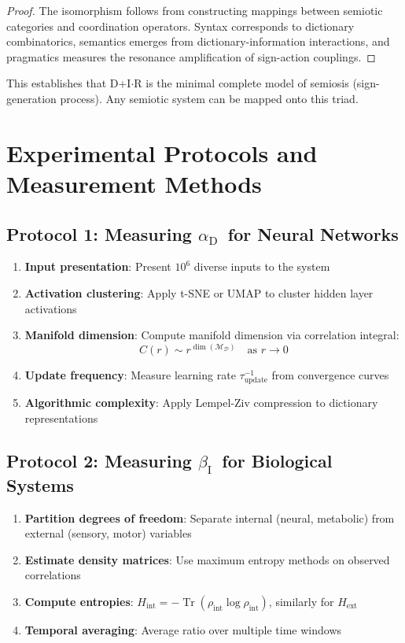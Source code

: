 \documentclass[12pt,a4paper]{article}
\DeclareMathOperator{\Tr}{Tr}
\DeclareMathOperator{\dimension}{dim}
\DeclareRobustCommand{\alD}{\texorpdfstring{\ensuremath{\alpha_{\mathrm{D}}}}{alpha_D}}
\DeclareRobustCommand{\beI}{\texorpdfstring{\ensuremath{\beta_{\mathrm{I}}}}{beta_I}}
\newcommand{\Dict}{\mathcal{D}}
\newcommand{\Mdict}{\mathcal{M}_{\Dict}}
\begin{document}
	\begin{proof}
		The isomorphism follows from constructing mappings between semiotic categories and coordination operators. Syntax corresponds to dictionary combinatorics, semantics emerges from dictionary-information interactions, and pragmatics measures the resonance amplification of sign-action couplings.
	\end{proof}
	
	This establishes that D+I\(\cdot\)R is the minimal complete model of semiosis (sign-generation process). Any semiotic system can be mapped onto this triad.
	
	\section{Experimental Protocols and Measurement Methods}
	
	\subsection{Protocol 1: Measuring \alD\ for Neural Networks}
	\label{subsec:protocol-alpha}
	
	\begin{enumerate}
		\item \textbf{Input presentation}: Present \(10^6\) diverse inputs to the system
		\item \textbf{Activation clustering}: Apply t-SNE or UMAP to cluster hidden layer activations
		\item \textbf{Manifold dimension}: Compute manifold dimension via correlation integral:
		\[
		C(r) \sim r^{\dimension(\Mdict)} \quad \text{as } r \to 0
		\]
		\item \textbf{Update frequency}: Measure learning rate \(\tau_{\mathrm{update}}^{-1}\) from convergence curves
		\item \textbf{Algorithmic complexity}: Apply Lempel-Ziv compression to dictionary representations
		\end{enumerate}
	
	
	
	\subsection{Protocol 2: Measuring \beI\ for Biological Systems}
	
	\begin{enumerate}
		\item \textbf{Partition degrees of freedom}: Separate internal (neural, metabolic) from external (sensory, motor) variables
		\item \textbf{Estimate density matrices}: Use maximum entropy methods on observed correlations
		\item \textbf{Compute entropies}: \(H_{\mathrm{int}} = -\Tr(\rho_{\mathrm{int}}\log\rho_{\mathrm{int}})\), similarly for \(H_{\mathrm{ext}}\)
		\item \textbf{Temporal averaging}: Average ratio over multiple time windows
	\end{enumerate}
	
\end{document}
